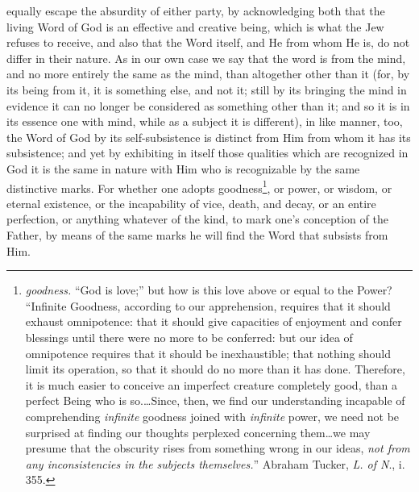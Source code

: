 equally escape the absurdity of either party, by acknowledging both that the living Word of God is an effective and creative being, which is what the Jew refuses to receive, and also that the Word itself, and He from whom He is, do not differ in their nature. As in our own case we say that the word is from the mind, and no more entirely the same as the mind, than altogether other than it (for, by its being from it, it is something else, and not it; still by its bringing the mind in evidence it can no longer be considered as something other than it; and so it is in its essence one with mind, while as a subject it is different), in like manner, too, the Word of God by its self-subsistence is distinct from Him from whom it has its subsistence; and yet by exhibiting in itself those qualities which are recognized in God it is the same in nature with Him who is recognizable by the same distinctive marks. For whether one adopts goodness\footnote{\emph{goodness.} “God is love;” but how is this love above or equal to the Power? “Infinite Goodness, according to our apprehension, requires that it should exhaust omnipotence: that it should give capacities of enjoyment and confer blessings until there were no more to be conferred: but our idea of omnipotence requires that it should be inexhaustible; that nothing should limit its operation, so that it should do no more than it has done. Therefore, it is much easier to conceive an imperfect creature completely good, than a perfect Being who is so.…Since, then, we find our understanding incapable of comprehending \emph{infinite} goodness joined with \emph{infinite} power, we need not be surprised at finding our thoughts perplexed concerning them…we may presume that the obscurity rises from something wrong in our ideas, \emph{not from any inconsistencies in the subjects themselves.}” Abraham Tucker, \emph{L. of N}., i. 355.}, or power, or wisdom, or eternal existence, or the incapability of vice, death, and decay, or an entire perfection, or anything whatever of the kind, to mark one’s conception of the Father, by means of the same marks he will find the Word that subsists from Him.


